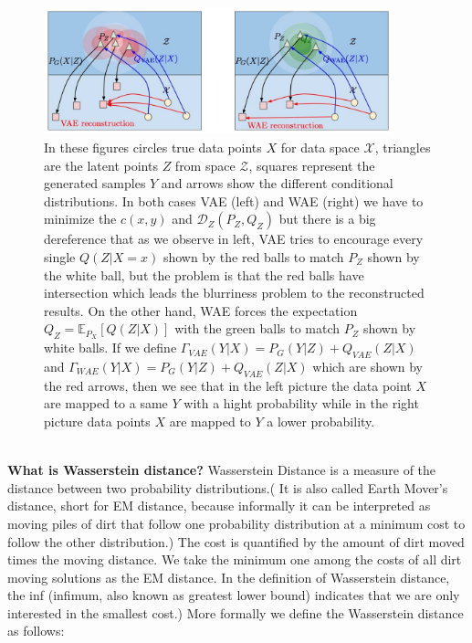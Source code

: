 \documentclass[12pt,english]{amsart}
\theoremstyle{definition}
\begin{document}
\begin{figure}[h!]
\centering
\includegraphics[width=0.9\textwidth]{diagram}

\caption{In these figures circles true data points $X$ for data space
$\mathcal{X}$, triangles are the latent points $Z$ from space $\mathcal{Z}$,
squares represent the generated samples $Y$ and arrows show the different
conditional distributions. In both cases VAE (left) and WAE (right) we have to
minimize the $c(x,y)$ and $\mathcal{D}_Z(P_Z,Q_Z)$  but there is a big
dereference that as we observe in left, VAE tries to encourage every single
$Q(Z|X=x)$ shown by the red balls to match $P_Z$ shown by the white ball, but
the problem is that the red balls have intersection which leads the blurriness
problem to the reconstructed results. On the other hand, WAE forces the
expectation $Q_Z= \mathbb{E}_{P_X}\left[ Q(Z|X)\right]$  with the green balls to
match $P_Z$ shown by white balls. If we define
$\Gamma_{VAE}(Y|X)= P_G(Y|Z)+ Q_{VAE}(Z|X)$ and
$\Gamma _{WAE}(Y|X)= P_G(Y|Z)+ Q_{VAE}(Z|X)$ which are shown by the red arrows,
then we see that in the left picture the data point $X$ are mapped to a same $Y$
with a hight probability while in the right picture data points $X$ are mapped to
$Y$ a lower probability. }

\label{Figure 1}
\end{figure}\\

 \textbf{What is Wasserstein distance?}
Wasserstein Distance is a measure of the distance between two probability
distributions.( It is also called Earth Mover's distance, short for EM distance,
because informally it can be interpreted as moving piles of dirt that follow one
probability distribution at a minimum cost to follow the other distribution.)
The cost is quantified by the amount of dirt moved times the moving distance. We
take the minimum one among the costs of all dirt moving solutions as the EM
distance. In the definition of Wasserstein distance, the inf (infimum, also
known as greatest lower bound) indicates that we are only interested in the
smallest cost.) More formally we define the Wasserstein distance as follows:
\end{document}
